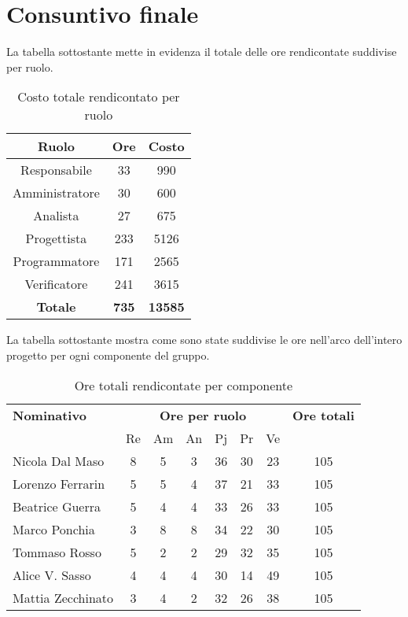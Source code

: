 \section{Consuntivo finale}\label{consuntivoFinale}
La tabella sottostante mette in evidenza il totale delle ore rendicontate suddivise per ruolo.
\begin{table}[H]
	\centering
	\begin{tabular}{|c|c|c|}
		\hline
		\textbf{Ruolo} &
		\textbf{Ore} &
		\textbf{Costo} \\
		\hline
		Responsabile & 33 & 990\\
		\hline
		Amministratore & 30 & 600\\
		\hline
		Analista & 27 & 675\\
		\hline
		Progettista & 233 & 5126 \\
		\hline
		Programmatore & 171 & 2565 \\
		\hline
		Verificatore & 241 & 3615\\
		\hline
		\textbf{Totale} & \textbf{735} & \textbf{13585} \\
		\hline
	\end{tabular}
	\caption{Costo totale rendicontato per ruolo}
\end{table}

La tabella sottostante mostra come sono state suddivise le ore nell'arco dell'intero progetto per ogni componente del gruppo.
\begin{table}[H]
	\centering
	\begin{tabular}{|l|c|c|c|c|c|c|c|}
		\hline
		\textbf{Nominativo} & 
		\multicolumn{6}{c|}{\textbf{Ore per ruolo}} & 
		\textbf{Ore totali} \\
		& Re & Am & An & Pj & Pr & Ve & \\
		\hline
		Nicola Dal Maso &8 &5 &3 &36 &30 &23 & 105 \\
		Lorenzo Ferrarin &5 &5 &4 &37 &21 &33 & 105 \\
		Beatrice Guerra &5 &4 &4 &33 &26 &33 & 105 \\
		Marco Ponchia &3 &8 &8 &34 &22 &30 & 105 \\
		Tommaso Rosso &5 &2 &2 &29 &32 &35 & 105 \\
		Alice V. Sasso &4 &4 &4 &30 &14 &49 & 105 \\
		Mattia Zecchinato &3 &4 &2 &32 &26 &38 & 105 \\
		\hline
	\end{tabular}
	\caption{Ore totali rendicontate per componente}
\end{table}

